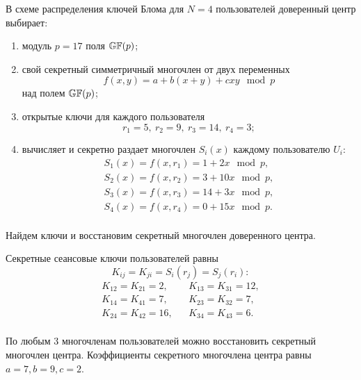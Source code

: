 \example
В схеме распределения ключей Блома для $N=4$ пользователей доверенный центр выбирает:
\begin{enumerate}
    \item модуль $p = 17$ поля $\mathbb{GF}(p)$;
    \item свой секретный симметричный многочлен от двух переменных
        \[ f(x,y) = a + b (x + y) + c x y \mod p \]
        над полем $\mathbb{GF}(p)$;
    \item открытые ключи для каждого пользователя
        \[ r_1 = 5, ~ r_2 = 9, ~ r_3 = 14, ~ r_4 = 3; \]
    \item вычисляет и секретно раздает многочлен $S_i(x)$ каждому пользователю $U_i$:
        \[ \begin{array}{l}
            S_1(x) = f(x, r_1) = 1 + 2x \mod p, \\
            S_2(x) = f(x, r_2) = 3 + 10x \mod p, \\
            S_3(x) = f(x, r_3) = 14 + 3x \mod p, \\
            S_4(x) = f(x, r_4) = 0 + 15x \mod p. \\
        \end{array} \]
\end{enumerate}
Найдем ключи и восстановим секретный многочлен доверенного центра.

Секретные сеансовые ключи пользователей равны
    \[ K_{ij} = K_{ji} = S_i(r_j) = S_j(r_i): \]
\[ \begin{array}{lcl}
    K_{12} = K_{21} = 2, & & K_{13} = K_{31} = 12, \\
    K_{14} = K_{41} = 7, & & K_{23} = K_{32} = 7, \\
    K_{24} = K_{42} = 16, & & K_{34} = K_{43} = 6. \\
\end{array} \]

По любым 3 многочленам пользователей можно восстановить секретный многочлен центра. Коэффициенты секретного многочлена центра равны $a=7, b=9, c=2$.
\exampleend

%
%
%
%
